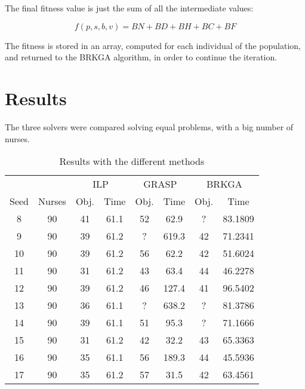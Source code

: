 \documentclass[12pt,a4paper]{article}
\begin{document}
The final fitness value is just the sum of all the intermediate values:

$$ f(p,s,b,v) = BN + BD + BH + BC + BF $$

The fitness is stored in an array, computed for each individual of the 
population, and returned to the BRKGA algorithm, in order to continue the 
iteration.

\section{Results}

The three solvers were compared solving equal problems, with a big number of 
nurses.

\begin{table}[h]
\centering
\begin{tabular}{cccccccc}
\toprule
       &          &\multicolumn{2}{c}{ILP} & \multicolumn{2}{c}{GRASP} & \multicolumn{2}{c}{BRKGA} \\
Seed   &  Nurses  & Obj. & Time & Obj. & Time & Obj. & Time \\
\midrule
     8 &     90   &     41   & 61.1    &       52  &   62.9      &     ?      &  83.1809 \\
     9 &     90   &     39   & 61.2    &       ?   &  619.3      &     42     &  71.2341 \\
    10 &     90   &     39   & 61.2    &       56  &   62.2      &     42     &  51.6024 \\
    11 &     90   &     31   & 61.2    &       43  &   63.4      &     44     &  46.2278 \\
    12 &     90   &     39   & 61.2    &       46  &  127.4      &     41     &  96.5402 \\
    13 &     90   &     36   & 61.1    &       ?   &  638.2      &     ?      &  81.3786 \\
    14 &     90   &     39   & 61.1    &       51  &   95.3      &     ?      &  71.1666 \\
    15 &     90   &     31   & 61.2    &       42  &   32.2      &     43     &  65.3363 \\
    16 &     90   &     35   & 61.1    &       56  &  189.3      &     44     &  45.5936 \\
    17 &     90   &     35   & 61.2    &       57  &   31.5      &     42     &  63.4561 \\
\bottomrule
\end{tabular}
\caption{Results with the different methods}
\label{tab:res}
\end{table}
\end{document}
